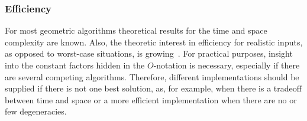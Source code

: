 \subsubsection*{Efficiency}
For most geometric algorithms theoretical results for the time and space
complexity are known. Also, the theoretic interest in efficiency for
realistic inputs, as opposed to worst-case situations, is
growing~\cite{v-ffrim-97}.
For practical purposes, insight into the constant factors hidden in the
$O$-notation is necessary, especially if there are several competing
algorithms.
\ccModifierCrossRefOff
{}
\ccModifierCrossRefOn
Therefore, different implementations should be supplied if there is 
not one best solution, as, for example, when there is a tradeoff between 
time and space or a more efficient implementation when there are no or few 
degeneracies. 
